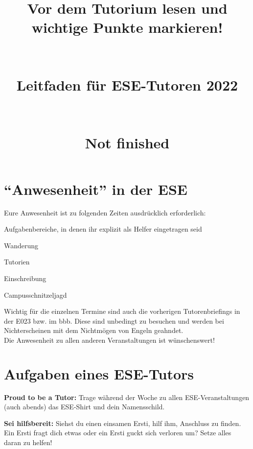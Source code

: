 \documentclass[a4paper,12pt]{scrreprt}
\begin{document}
\title{\huge{\textbf{Vor dem Tutorium lesen und wichtige Punkte markieren!}}\\\ \\\ \\{Leitfaden für ESE-Tutoren 2022}\\ \\ \\{Not finished}}



\date{}

\author{}
\maketitle

\section*{\enquote{Anwesenheit} in der ESE}
Eure Anwesenheit ist zu folgenden Zeiten ausdrücklich erforderlich:
\begin{itemize*}
    \item Aufgabenbereiche, in denen ihr explizit als Helfer eingetragen seid
    \item Wanderung
    \item Tutorien
    \item Einschreibung
    \item Campusschnitzeljagd
\end{itemize*}
Wichtig für die einzelnen Termine sind auch die vorherigen Tutorenbriefings in der E023 bzw. im bbb. Diese sind unbedingt zu besuchen und werden bei Nichterscheinen mit dem Nichtmögen von Engeln geahndet.\\
Die Anwesenheit zu allen anderen Veranstaltungen ist wünschenswert!

\section*{Aufgaben eines ESE-Tutors}

\begin{itemize*}
    \item \textbf{Proud to be a Tutor:} Trage während der Woche zu allen ESE-Veranstaltungen (auch abends) das ESE-Shirt und dein Namensschild.
    \item \textbf{Sei hilfsbereit:} Siehst du einen einsamen Ersti, hilf ihm, Anschluss zu finden. Ein Ersti fragt dich etwas oder ein Ersti guckt sich verloren um? Setze alles daran zu helfen!
\end{itemize*}
\end{document}
